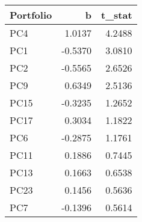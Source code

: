 \begin{tabular}{lrr}
\toprule
Portfolio & b & t_stat \\
\midrule
PC4 & 1.0137 & 4.2488 \\
PC1 & -0.5370 & 3.0810 \\
PC2 & -0.5565 & 2.6526 \\
PC9 & 0.6349 & 2.5136 \\
PC15 & -0.3235 & 1.2652 \\
PC17 & 0.3034 & 1.1822 \\
PC6 & -0.2875 & 1.1761 \\
PC11 & 0.1886 & 0.7445 \\
PC13 & 0.1663 & 0.6538 \\
PC23 & 0.1456 & 0.5636 \\
PC7 & -0.1396 & 0.5614 \\
\bottomrule
\end{tabular}
